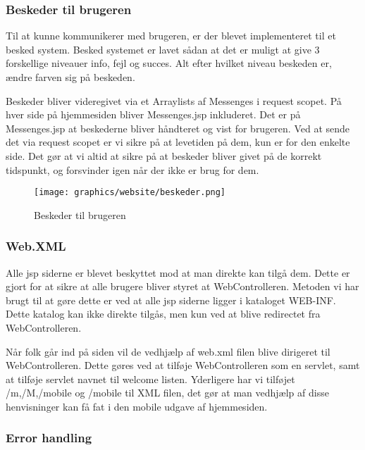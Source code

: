 \documentclass[a4paper]{article}
\begin{document}

\subsubsection{Beskeder til brugeren} %

Til at kunne kommunikerer med brugeren, er der blevet implementeret til et besked system. Besked systemet er lavet sådan at det er muligt at give 3 forskellige niveauer info, fejl og succes. Alt efter hvilket niveau beskeden er, ændre farven sig på beskeden. 

Beskeder bliver videregivet via et Arraylists af Messenges i request scopet. På hver side på hjemmesiden bliver Messenges.jsp inkluderet. Det er på Messenges.jsp at beskederne bliver håndteret og vist for brugeren. Ved at sende det via request scopet er vi sikre på at levetiden på dem, kun er for den enkelte side. Det gør at vi altid at sikre på at beskeder bliver givet på de korrekt tidspunkt, og forsvinder igen når der ikke er brug for dem.

\begin{figure}[h!]
  \centering
  \texttt{[image: graphics/website/beskeder.png]}
  \caption{Beskeder til brugeren}
\end{figure}



\subsubsection{Web.XML} %

Alle jsp siderne er blevet beskyttet mod at man direkte kan tilgå dem. Dette er gjort for at sikre at alle brugere bliver styret at WebControlleren. Metoden vi har brugt til at gøre dette er ved at alle jsp siderne ligger i kataloget WEB-INF. Dette katalog kan ikke direkte tilgås, men kun ved at blive redirectet fra WebControlleren. 

Når folk går ind på siden vil de vedhjælp af web.xml filen blive dirigeret til WebControlleren. Dette gøres ved at tilføje WebControlleren som en servlet, samt at tilføje servlet navnet til welcome listen. Yderligere har vi tilføjet /m,/M,/mobile og /mobile til XML filen, det gør at man vedhjælp af disse henvisninger kan få fat i den mobile udgave af hjemmesiden.


\subsubsection{Error handling} %
\end{document}
